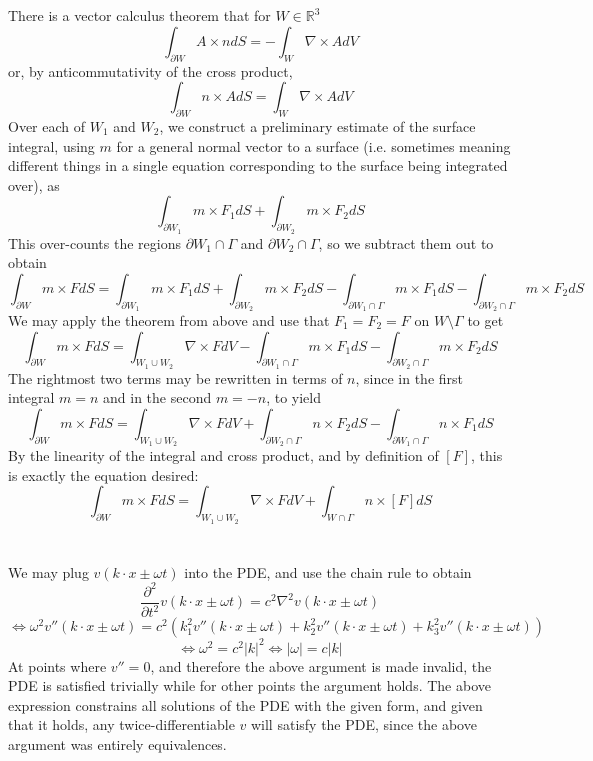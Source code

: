 \documentclass{article}
\begin{document}
\section{}
There is a vector calculus theorem that for $W\in\mathbb{R}^3$
\[\int_{\partial W} A\times ndS = -\int_W\nabla\times AdV\]
or, by anticommutativity of the cross product,
\[\int_{\partial W} n\times AdS  = \int_W\nabla\times AdV\]
Over each of $W_1$ and $W_2$, we construct a preliminary estimate of the surface integral, using $m$ for a general normal vector to a surface (i.e. sometimes meaning different things in a single equation corresponding to the surface being integrated over), as
\[\int_{\partial W_1}m\times F_1dS+\int_{\partial W_2}m\times F_2dS\]
This over-counts the regions $\partial W_1\cap\Gamma$ and $\partial W_2\cap\Gamma$, so we subtract them out to obtain
\[\int_{\partial W}m\times FdS=\int_{\partial W_1}m\times F_1dS+\int_{\partial W_2}m\times F_2dS - \int_{\partial W_1\cap\Gamma}m\times F_1dS -\int_{\partial W_2\cap\Gamma}m\times F_2dS\]
We may apply the theorem from above and use that $F_1=F_2=F$ on $W\setminus\Gamma$ to get
\[\int_{\partial W}m\times FdS=\int_{W_1\cup W_2}\nabla\times FdV - \int_{\partial W_1\cap\Gamma}m\times F_1dS -\int_{\partial W_2\cap\Gamma}m\times F_2dS\]
The rightmost two terms may be rewritten in terms of $n$, since in the first integral $m=n$ and in the second $m=-n$, to yield
\[\int_{\partial W}m\times FdS=\int_{W_1\cup W_2}\nabla\times FdV+\int_{\partial W_2\cap\Gamma}n\times F_2dS-\int_{\partial W_1\cap\Gamma}n\times F_1dS\]
By the linearity of the integral and cross product, and by definition of $[F]$, this is exactly the equation desired:
\[\int_{\partial W}m\times FdS=\int_{W_1\cup W_2}\nabla\times FdV+\int_{W\cap\Gamma}n\times[F]dS\]

\section{}
We may plug $v(k\cdot x\pm \omega t)$ into the PDE, and use the chain rule to obtain
\[\frac{\partial^2}{\partial t^2}v(k\cdot x\pm \omega t) = c^2\nabla^2v(k\cdot x\pm \omega t)\]
\[\Leftrightarrow \omega^2 v''(k\cdot x\pm \omega t)=c^2(k_1^2v''(k\cdot x\pm \omega t)+k_2^2v''(k\cdot x\pm \omega t)+k_3^2v''(k\cdot x\pm \omega t)) \]
\[\Leftrightarrow \omega^2=c^2|k|^2\Leftrightarrow |\omega| = c|k|\]
At points where $v''=0$, and therefore the above argument is made invalid, the PDE is satisfied trivially while for other points the argument holds. The above expression constrains all solutions of the PDE with the given form, and given that it holds, any twice-differentiable $v$ will satisfy the PDE, since the above argument was entirely equivalences.
\end{document}
